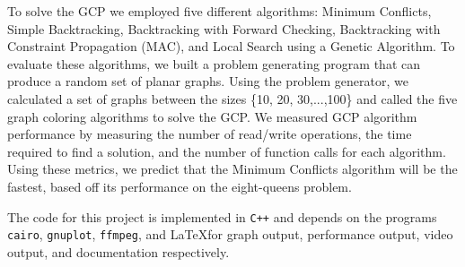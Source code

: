 \documentclass{article}
\begin{document}
	To solve the GCP we employed five different algorithms: Minimum Conflicts, Simple Backtracking, Backtracking with Forward Checking, Backtracking with Constraint Propagation (MAC), and Local Search using a Genetic Algorithm. To evaluate these algorithms, we built a problem generating program that can produce a random set of planar graphs. Using the problem generator, we calculated a set of graphs between the sizes \{10, 20, 30,...,100\} and called the five graph coloring algorithms to solve the GCP. We measured GCP algorithm performance by measuring the number of read/write operations, the time required to find a solution, and the number of function calls for each algorithm. Using these metrics, we predict that the Minimum Conflicts algorithm will be the fastest, based off its performance on the eight-queens problem\cite{MINTON}.


\par The code for this project is implemented in \texttt{C++} and depends on the programs \texttt{cairo}, \texttt{gnuplot}, \texttt{ffmpeg}, and \LaTeX \space for graph output, performance output, video output, and documentation respectively.
\end{document}
